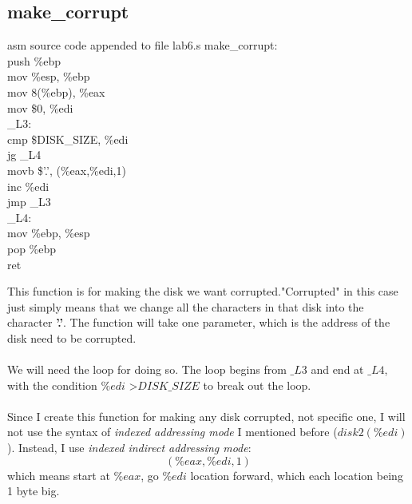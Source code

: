 \documentclass{article}
\begin{document}
\subsection{make\_corrupt}
\begin{multicols}{2}
\begin{GFT}{asm source code appended to file lab6.s}
\+make\_corrupt:\\
\+push \%ebp\\
\+mov \%esp, \%ebp\\
\+mov 8(\%ebp), \%eax\\
\+mov \$0, \%edi\\
\+\_L3:\\
\+cmp \$DISK\_SIZE, \%edi\\
\+jg \_L4\\
\+movb \$'.', (\%eax,\%edi,1)\\
\+inc \%edi\\
\+jmp \_L3\\
\+\_L4:\\
\+mov \%ebp, \%esp\\
\+pop \%ebp\\
\+ret\\
\end{GFT}
\columnbreak
This function is for making the disk we want corrupted."Corrupted" in this case just simply means that we change all the characters in that disk into the character \textbf{'.'}. The function will take one parameter, which is the address of the disk need to be corrupted. \\ \\
We will need the loop for doing so. The loop begins from $\_L3$ and end at $\_L4$, with the condition $\%edi$ \textgreater $DISK\_SIZE$ to break out the loop. \\ \\
Since I create this function for making any disk corrupted, not specific one, I will not use the syntax of \textit{indexed addressing mode} I mentioned before ($disk2(\%edi)$). Instead, I use \textit{indexed indirect addressing mode}: 
\[ ( \%eax,\%edi,1) \]
which means start at $\%eax$, go $\%edi$ location forward, which each location being 1 byte big.
\end{multicols}
\clearpage
\end{document}
